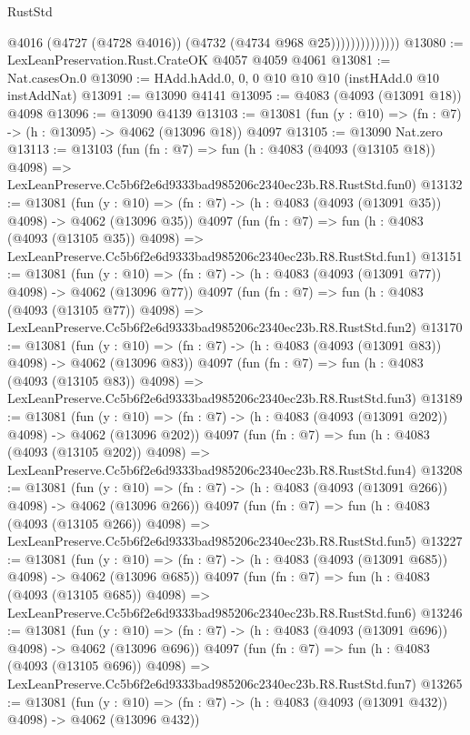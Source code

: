\begin{lexlean}{RustStd}
\begin{coremodule}
                            @4016
                            (@4727 (@4728 @4016))
                            (@4732 (@4734 @968 @25))))))))))))))
@13080 := LexLeanPreservation.Rust.CrateOK @4057 @4059 @4061
@13081 := Nat.casesOn.{0}
@13090 := HAdd.hAdd.{0, 0, 0} @10 @10 @10 (instHAdd.{0} @10 instAddNat)
@13091 := @13090 @4141
@13095 := @4083 (@4093 (@13091 @18)) @4098
@13096 := @13090 @4139
@13103 := @13081 (fun (y : @10) => (fn : @7) -> (h : @13095) -> @4062 (@13096 @18)) @4097
@13105 := @13090 Nat.zero
@13113 := @13103
    (fun (fn : @7) =>
    fun (h : @4083 (@4093 (@13105 @18)) @4098) =>
    LexLeanPreserve.Cc5b6f2e6d9333bad985206c2340ec23b.R8.RustStd.fun0)
@13132 := @13081
    (fun (y : @10) => (fn : @7) -> (h : @4083 (@4093 (@13091 @35)) @4098) -> @4062 (@13096 @35))
    @4097
    (fun (fn : @7) =>
    fun (h : @4083 (@4093 (@13105 @35)) @4098) =>
    LexLeanPreserve.Cc5b6f2e6d9333bad985206c2340ec23b.R8.RustStd.fun1)
@13151 := @13081
    (fun (y : @10) => (fn : @7) -> (h : @4083 (@4093 (@13091 @77)) @4098) -> @4062 (@13096 @77))
    @4097
    (fun (fn : @7) =>
    fun (h : @4083 (@4093 (@13105 @77)) @4098) =>
    LexLeanPreserve.Cc5b6f2e6d9333bad985206c2340ec23b.R8.RustStd.fun2)
@13170 := @13081
    (fun (y : @10) => (fn : @7) -> (h : @4083 (@4093 (@13091 @83)) @4098) -> @4062 (@13096 @83))
    @4097
    (fun (fn : @7) =>
    fun (h : @4083 (@4093 (@13105 @83)) @4098) =>
    LexLeanPreserve.Cc5b6f2e6d9333bad985206c2340ec23b.R8.RustStd.fun3)
@13189 := @13081
    (fun (y : @10) => (fn : @7) -> (h : @4083 (@4093 (@13091 @202)) @4098) -> @4062 (@13096 @202))
    @4097
    (fun (fn : @7) =>
    fun (h : @4083 (@4093 (@13105 @202)) @4098) =>
    LexLeanPreserve.Cc5b6f2e6d9333bad985206c2340ec23b.R8.RustStd.fun4)
@13208 := @13081
    (fun (y : @10) => (fn : @7) -> (h : @4083 (@4093 (@13091 @266)) @4098) -> @4062 (@13096 @266))
    @4097
    (fun (fn : @7) =>
    fun (h : @4083 (@4093 (@13105 @266)) @4098) =>
    LexLeanPreserve.Cc5b6f2e6d9333bad985206c2340ec23b.R8.RustStd.fun5)
@13227 := @13081
    (fun (y : @10) => (fn : @7) -> (h : @4083 (@4093 (@13091 @685)) @4098) -> @4062 (@13096 @685))
    @4097
    (fun (fn : @7) =>
    fun (h : @4083 (@4093 (@13105 @685)) @4098) =>
    LexLeanPreserve.Cc5b6f2e6d9333bad985206c2340ec23b.R8.RustStd.fun6)
@13246 := @13081
    (fun (y : @10) => (fn : @7) -> (h : @4083 (@4093 (@13091 @696)) @4098) -> @4062 (@13096 @696))
    @4097
    (fun (fn : @7) =>
    fun (h : @4083 (@4093 (@13105 @696)) @4098) =>
    LexLeanPreserve.Cc5b6f2e6d9333bad985206c2340ec23b.R8.RustStd.fun7)
@13265 := @13081
    (fun (y : @10) => (fn : @7) -> (h : @4083 (@4093 (@13091 @432)) @4098) -> @4062 (@13096 @432))

\end{coremodule}
\end{lexlean}
